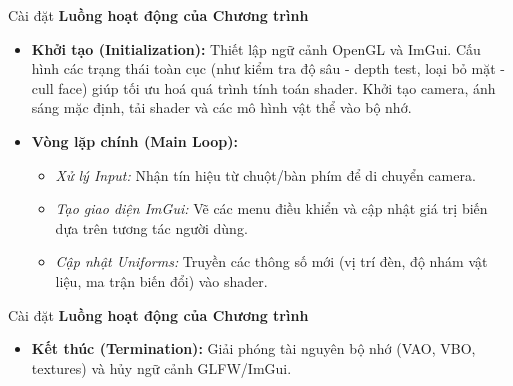 \documentclass[11pt, aspectratio=169]{beamer}
\begin{document}
\begin{frame}{Cài đặt}
	\textbf{Luồng hoạt động của Chương trình}
	
	\begin{itemize}
		\item \textbf{Khởi tạo (Initialization):} 
		Thiết lập ngữ cảnh OpenGL và ImGui. Cấu hình các trạng thái toàn cục (như kiểm tra độ sâu - depth test, loại bỏ mặt - cull face) giúp tối ưu hoá quá trình tính toán shader. Khởi tạo camera, ánh sáng mặc định, tải shader và các mô hình vật thể vào bộ nhớ.
		
		\item \textbf{Vòng lặp chính (Main Loop):}
		\begin{itemize}
			\item \textit{Xử lý Input:} Nhận tín hiệu từ chuột/bàn phím để di chuyển camera.
			
			\item \textit{Tạo giao diện ImGui:} Vẽ các menu điều khiển và cập nhật giá trị biến dựa trên tương tác người dùng.
			
			\item \textit{Cập nhật Uniforms:} Truyền các thông số mới (vị trí đèn, độ nhám vật liệu, ma trận biến đổi) vào shader.
		\end{itemize}
	\end{itemize}
\end{frame}

\begin{frame}{Cài đặt}
	\textbf{Luồng hoạt động của Chương trình}
	
	\begin{itemize}
		\begin{itemize}
			\item \textit{Bước 1 - Shadow Pass:} Render cảnh từ vị trí nguồn sáng để tạo Shadow Map (bản đồ bóng).
			
			\item \textit{Bước 2 - Render Scene:} Render cảnh từ góc nhìn camera sử dụng shader ánh sáng được chọn, kết hợp với Shadow Map để tính toán bóng đổ.
			
			\item \textit{Swap Buffers:} Hiển thị khung hình mới lên màn hình.
		\end{itemize}
		
		\item \textbf{Kết thúc (Termination):} Giải phóng tài nguyên bộ nhớ (VAO, VBO, textures) và hủy ngữ cảnh GLFW/ImGui.
	\end{itemize}
\end{frame}
\end{document}
